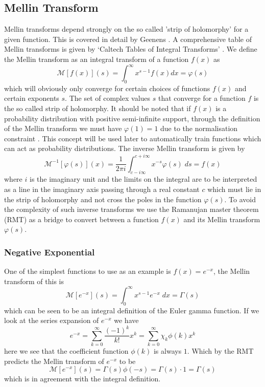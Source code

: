 \documentclass{article}
\begin{document}
\subsection{Mellin Transform}
Mellin transforms depend strongly on the so called 'strip of holomorphy' for a given function. This is covered in detail by Geenens \cite{Geenens2017}. A comprehensive table of Mellin transforms is given by `Caltech Tables of Integral Transforms' \cite{Erdelyi1954}. We define the Mellin transform as an integral transform of a function $f(x)$ as
\begin{equation}
\mathcal{M}[f(x)](s) = \int_0^\infty x^{s-1}f(x) dx = \varphi(s)
\end{equation}
which will obviously only converge for certain choices of functions $f(x)$ and certain exponents $s$. The set of complex values $s$ that converge for a function $f$ is the so called strip of holomorphy. It should be noted that if $f(x)$ is a probability distribution with positive semi-infinite support, through the definition of the Mellin transform we must have $\varphi(1)=1$ due to the normalisation constraint \cite{Geenens2017}. This concept will be used later to automatically train functions which can act as probability distributions. The inverse Mellin transform is given by
\begin{equation}
\mathcal{M}^{-1}[\varphi(s)](x) = \frac{1}{2 \pi i}\int_{c- i \infty}^{c + i \infty} x^{-s} \varphi(s) \; ds = f(x)
\label{eqn:InverseMT}
\end{equation}
where $i$ is the imaginary unit and the limits on the integral are to be interpreted as a line in the imaginary axis passing through a real constant $c$ which must lie in the strip of holomorphy and not cross the poles in the function $\varphi(s)$. To avoid the complexity of such inverse transforms we use the Ramanujan master theorem (RMT) as a bridge to convert between a function $f(x)$ and its Mellin transform $\varphi(s)$.


\subsubsection{Negative Exponential}
One of the simplest functions to use as an example is $f(x)=e^{-x}$, the Mellin transform of this is
\begin{equation}
\mathcal{M}[e^{-x}](s) = \int_0^\infty x^{s-1}e^{-x} \; dx = \Gamma(s)
\end{equation}
which can be seen to be an integral definition of the Euler gamma function. If we look at the series expansion of $e^{-x}$ we have
\begin{equation}
e^{-x} = \sum_{k=0}^\infty \frac{(-1)^k}{k!} x^k = \sum_{k=0}^\infty \chi_k \phi(k) x^k
\end{equation}
here we see that the coefficient function $\phi(k)$ is always $1$. Which by the RMT predicts the Mellin transform of $e^{-x}$ to be
\begin{equation}
\mathcal{M}[e^{-x}](s) = \Gamma(s)\phi(-s) = \Gamma(s)\cdot 1 = \Gamma(s)
\end{equation}
which is in agreement with the integral definition.
\end{document}
